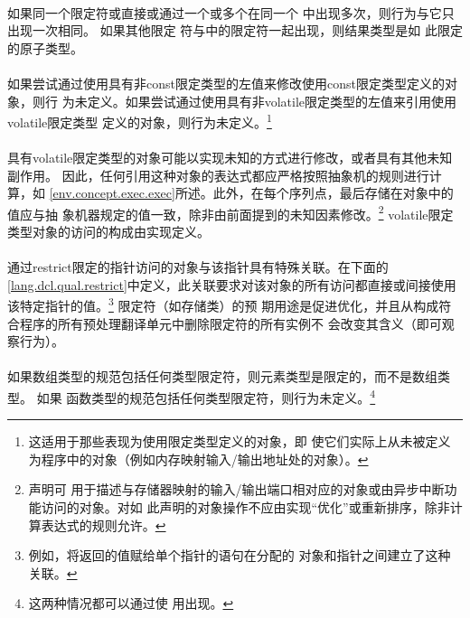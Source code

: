 {\paragraph{}
如果同一个限定符或直接或通过一个或多个在同一个
中出现多次，则行为与它只出现一次相同。 如果其他限定
符与中的限定符一起出现，则结果类型是如
此限定的原子类型。

\paragraph{}
如果尝试通过使用具有非const限定类型的左值来修改使用const限定类型定义的对象，则行
为未定义。如果尝试通过使用具有非volatile限定类型的左值来引用使用volatile限定类型
定义的对象，则行为未定义。\footnote{这适用于那些表现为使用限定类型定义的对象，即
使它们实际上从未被定义为程序中的对象（例如内存映射输入/输出地址处的对象）。}

\paragraph{}
具有volatile限定类型的对象可能以实现未知的方式进行修改，或者具有其他未知副作用。
因此，任何引用这种对象的表达式都应严格按照抽象机的规则进行计算，如
\ref{env.concept.exec.exec}所述。此外，在每个序列点，最后存储在对象中的值应与抽
象机器规定的值一致，除非由前面提到的未知因素修改。\footnote{声明可
用于描述与存储器映射的输入/输出端口相对应的对象或由异步中断功能访问的对象。对如
此声明的对象操作不应由实现``优化''或重新排序，除非计算表达式的规则允许。}
volatile限定类型对象的访问的构成由实现定义。

\paragraph{}
通过restrict限定的指针访问的对象与该指针具有特殊关联。在下面的
\ref{lang.dcl.qual.restrict}中定义，此关联要求对该对象的所有访问都直接或间接使用
该特定指针的值。\footnote{例如，将返回的值赋给单个指针的语句在分配的
对象和指针之间建立了这种关联。} 限定符（如存储类）的预
期用途是促进优化，并且从构成符合程序的所有预处理翻译单元中删除限定符的所有实例不
会改变其含义（即可观察行为）。

\paragraph{}
如果数组类型的规范包括任何类型限定符，则元素类型是限定的，而不是数组类型。 如果
函数类型的规范包括任何类型限定符，则行为未定义。\footnote{这两种情况都可以通过使
用出现。}

}
